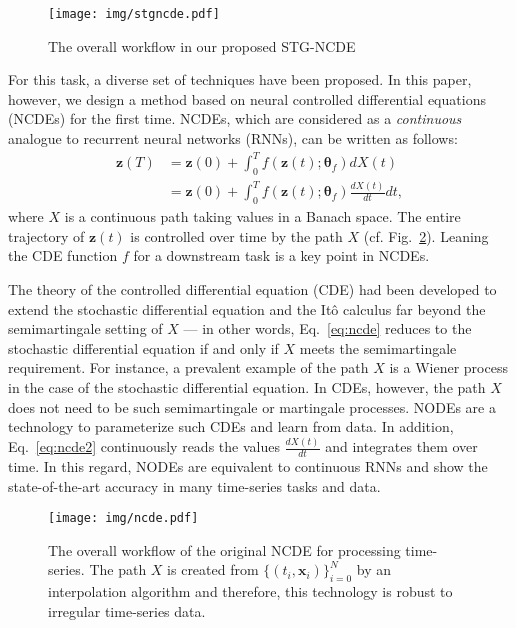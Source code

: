 \documentclass[letterpaper]{article} \usepackage{aaai22}  \usepackage{times}  \usepackage{helvet}  \usepackage{courier}  \usepackage[hyphens]{url}  \usepackage{graphicx} \urlstyle{rm} \def\UrlFont{\rm}  \usepackage{natbib}  \usepackage{caption} \DeclareCaptionStyle{ruled}{labelfont=normalfont,labelsep=colon,strut=off} \frenchspacing  \setlength{\pdfpagewidth}{8.5in}  \setlength{\pdfpageheight}{11in}  \usepackage{stfloats}
\begin{document}
\begin{figure}[t]
    \centering
    \texttt{[image: img/stgncde.pdf]}
    \caption{The overall workflow in our proposed STG-NCDE}
    \label{fig:stgncde}
\end{figure}

For this task, a diverse set of techniques have been proposed. In this paper, however, we design a method based on neural controlled differential equations (NCDEs) for the first time. NCDEs, which are considered as a \emph{continuous} analogue to recurrent neural networks (RNNs), can be written as follows:
\begin{align}\label{eq:ncde}
\bm{z}(T) &= \bm{z}(0) + \int_{0}^{T} f(\bm{z}(t);\bm{\theta}_f) dX(t)\\&= \bm{z}(0) + \int_{0}^{T} f(\bm{z}(t);\bm{\theta}_f) \frac{dX(t)}{dt} dt,\label{eq:ncde2}
\end{align}where $X$ is a continuous path taking values in a Banach space. The entire trajectory of $\bm{z}(t)$ is controlled over time by the path $X$ (cf. Fig.~\ref{fig:ncde}). Leaning the CDE function $f$ for a downstream task is a key point in NCDEs.

The theory of the controlled differential equation (CDE) had been developed to extend the stochastic differential equation and the It\^{o} calculus far beyond the semimartingale setting of $X$ --- in other words, Eq.~\eqref{eq:ncde} reduces to the stochastic differential equation if and only if $X$ meets the semimartingale requirement. For instance, a prevalent example of the path $X$ is a Wiener process in the case of the stochastic differential equation. In CDEs, however, the path $X$ does not need to be such semimartingale or martingale processes. NODEs are a technology to parameterize such CDEs and learn from data. In addition, Eq.~\eqref{eq:ncde2} continuously reads the values $\frac{dX(t)}{dt}$ and integrates them over time. In this regard, NODEs are equivalent to continuous RNNs and show the state-of-the-art accuracy in many time-series tasks and data.



\begin{figure}[t]
    \centering
    \texttt{[image: img/ncde.pdf]}
    \caption{The overall workflow of the original NCDE for processing time-series. The path $X$ is created from $\{(t_i, \bm{x}_{i})\}_{i=0}^N$ by an interpolation algorithm and therefore, this technology is robust to irregular time-series data.}
    \label{fig:ncde}
\end{figure}
\end{document}
